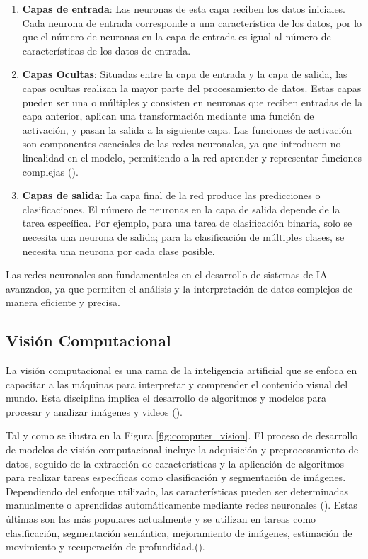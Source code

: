 \begin{enumerate}[topsep=0pt, itemsep=0mm]  
    \item \textbf{Capas de entrada}: Las neuronas de esta capa reciben los datos iniciales. Cada neurona de entrada corresponde a una característica de los datos, por lo que el número de neuronas en la capa de entrada es igual al número de características de los datos de entrada.
    \item \textbf{Capas Ocultas}: Situadas entre la capa de entrada y la capa de salida, las capas ocultas realizan la mayor parte del procesamiento de datos. Estas capas pueden ser una o múltiples y consisten en neuronas que reciben entradas de la capa anterior, aplican una transformación mediante una función de activación, y pasan la salida a la siguiente capa. Las funciones de activación son componentes esenciales de las redes neuronales, ya que introducen no linealidad en el modelo, permitiendo a la red aprender y representar funciones complejas (\cite{nielsen2015neural}).
    \item \textbf{Capas de salida}: La capa final de la red produce las predicciones o clasificaciones. El número de neuronas en la capa de salida depende de la tarea específica. Por ejemplo, para una tarea de clasificación binaria, solo se necesita una neurona de salida; para la clasificación de múltiples clases, se necesita una neurona por cada clase posible.
\end{enumerate} 

Las redes neuronales son fundamentales en el desarrollo de sistemas de IA avanzados, ya que permiten el análisis y la interpretación de datos complejos de manera eficiente y precisa.

\subsection{Visión Computacional}
La visión computacional es una rama de la inteligencia artificial que se enfoca en capacitar a las máquinas para interpretar y comprender el contenido visual del mundo. Esta disciplina implica el desarrollo de algoritmos y modelos para procesar y analizar imágenes y videos (\cite{szeliski2022computer}).

Tal y como se ilustra en la Figura \ref{fig:computer_vision}.  El proceso de desarrollo de modelos de visión computacional incluye la adquisición y preprocesamiento de datos, seguido de la extracción de características y la aplicación de algoritmos para realizar tareas específicas como clasificación y segmentación de imágenes. Dependiendo del enfoque utilizado, las características pueden ser determinadas manualmente o aprendidas automáticamente mediante redes neuronales (\cite{goodfellow2016deep}). Estas últimas son las más populares actualmente y se utilizan en tareas como clasificación, segmentación semántica, mejoramiento de imágenes, estimación de movimiento y recuperación de profundidad.(\cite{szeliski2022computer}).

